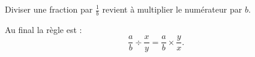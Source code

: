 

\begin{Aretenir}
    Diviser une fraction par \( \frac{1}{ b }\) revient à multiplier le numérateur par \( b\).
\end{Aretenir}

\begin{Aretenir}
    Au final la règle est :
    \begin{equation}
        \frac{ a }{ b }\div \frac{ x }{ y }=\frac{ a }{ b }\times \frac{ y }{ x }.
    \end{equation}
\end{Aretenir}
